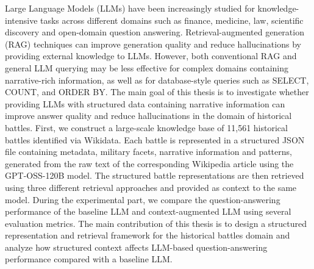 Large Language Models (LLMs) have been increasingly studied for knowledge-intensive tasks across different domains such as finance, medicine, law, scientific discovery and open-domain question answering. Retrieval-augmented generation (RAG) techniques can improve generation quality and reduce hallucinations by providing external knowledge to LLMs. However, both conventional RAG and general LLM querying may be less effective for complex domains containing narrative-rich information, as well as for database-style queries such as SELECT, COUNT, and ORDER BY. The main goal of this thesis is to investigate whether providing LLMs with structured data containing narrative information can improve answer quality and reduce hallucinations in the domain of historical battles. First, we construct a large-scale knowledge base of 11,561 historical battles identified via Wikidata. Each battle is represented in a structured JSON file containing metadata, military facets, narrative information and patterns, generated from the raw text of the corresponding Wikipedia article using the GPT-OSS-120B model. The structured battle representations are then retrieved using three different retrieval approaches and provided as context to the same model. During the experimental part, we compare the question-answering performance of the baseline LLM and context-augmented LLM using several evaluation metrics. The main contribution of this thesis is to design a structured representation and retrieval framework for the historical battles domain and analyze how structured context affects LLM-based question-answering performance compared with a baseline LLM.